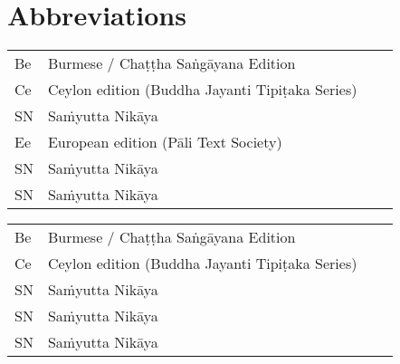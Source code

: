 
\chapter{Abbreviations}
\label{abbreviations}



\ifninebythirteenversion

\vspace{-0.6em}
\begin{tabular}{@{}llll@{}}
  Be    & Burmese / Chaṭṭha Saṅgāyana Edition                 \\
  Ce    & Ceylon edition (Buddha Jayanti Tipiṭaka Series)     \\
  SN    & Saṁyutta Nikāya                                     \\
  Ee    & European edition (Pāli Text Society)                \\
  SN    & Saṁyutta Nikāya                                     \\
  SN    & Saṁyutta Nikāya                                     \\
\end{tabular}

\else

\begin{tabular}{@{}llll@{}}
  Be    & Burmese / Chaṭṭha Saṅgāyana Edition                 \\
  Ce    & Ceylon edition (Buddha Jayanti Tipiṭaka Series)     \\
  SN    & Saṁyutta Nikāya                                     \\
  SN    & Saṁyutta Nikāya                                     \\
  SN    & Saṁyutta Nikāya                                     \\
\end{tabular}

\medskip

\fi

